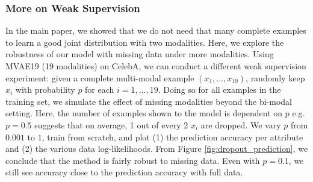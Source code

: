 \subsubsection{More on Weak Supervision}

In the main paper, we showed that we do not need that many complete examples to learn a good joint distribution with two modalities. Here, we explore the robustness of our model with missing data under more modalities. Using MVAE19 (19 modalities) on CelebA, we can conduct a different weak supervision experiment: given a complete multi-modal example $(x_{1}, ..., x_{19})$, randomly keep $x_{i}$ with probability $p$ for each $i=1, ..., 19$. Doing so for all examples in the training set, we simulate the effect of missing modalities beyond the bi-modal setting. Here, the number of examples shown to the model is dependent on $p$ e.g. $p = 0.5$ suggests that on average, 1 out of every 2 $x_{i}$ are dropped. We vary $p$ from $0.001$ to $1$, train from scratch, and plot (1) the prediction accuracy per attribute and (2) the various data log-likelihoods. From Figure \ref{fig:dropout_prediction}, we conclude that the method is fairly robust to missing data. Even with $p=0.1$, we still see accuracy close to the prediction accuracy with full data.

